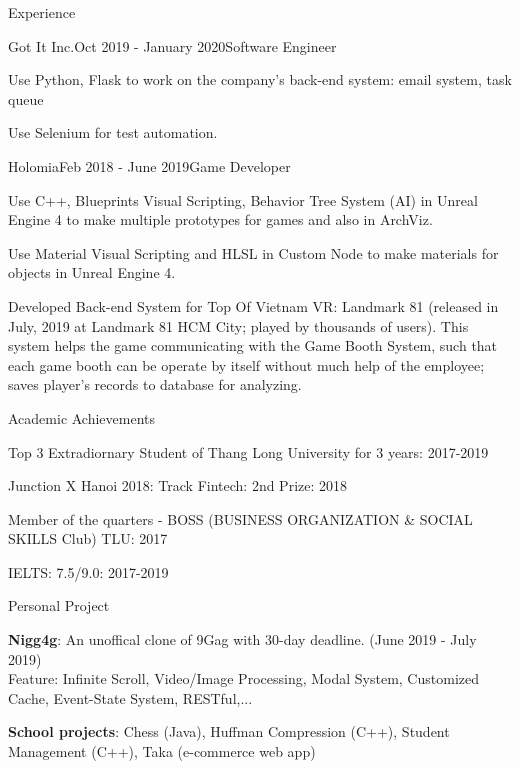 \documentclass{resume} %
\begin{document}
\begin{rSection}{Experience}

\begin{rSubsection}{Got It Inc.}{Oct 2019 - January 2020}{Software Engineer}{}
  \item Use Python, Flask to work on the company's back-end system: email system, task queue
  \item Use Selenium for test automation.
  \end{rSubsection}
    
\begin{rSubsection}{Holomia}{Feb 2018 - June 2019}{Game Developer}{}
\item Use C++, Blueprints Visual Scripting, Behavior Tree System (AI) in Unreal Engine 4 to make multiple prototypes for games and also in ArchViz.
\item Use Material Visual Scripting and HLSL in Custom Node to make materials for objects in Unreal Engine 4.
\item Developed Back-end System for Top Of Vietnam VR: Landmark 81 (released in July, 2019 at Landmark 81 HCM City; played by thousands of users). This system helps the game communicating with the Game Booth System, such that each game booth can be operate by itself without much help of the employee; saves player's records to database for analyzing.
\end{rSubsection}

\end{rSection}



\begin{rSection}{Academic Achievements} \itemsep -2pt
\item Top 3 Extradiornary Student of Thang Long University for 3 years: 2017-2019 
\item Junction X Hanoi 2018: Track Fintech: 2nd Prize: 2018
\item Member of the quarters - BOSS (BUSINESS ORGANIZATION \& SOCIAL SKILLS Club) TLU: 2017
\item IELTS: 7.5/9.0: 2017-2019
\end{rSection}

\begin{rSection}{Personal Project}

\item  \textbf{Nigg4g}: An unoffical clone of 9Gag with 30-day deadline. (June 2019 - July 2019)
\\Feature: Infinite Scroll, Video/Image Processing, Modal System, Customized Cache, Event-State System, RESTful,...
\item  \textbf{School projects}: Chess (Java), Huffman Compression (C++), Student Management (C++), Taka (e-commerce web app)

\end{rSection}
\end{document}
